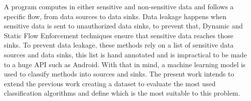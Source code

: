 A program computes in either sensitive and non-sensitive data and follows a specific flow, from data sources to data sinks.
Data leakage happens when sensitive data is sent to unauthorized data sinks, to prevent that, Dynamic and Static Flow Enforcement 
techniques ensure that sensitive data reaches those sinks. To prevent data leakage, 
these methods rely on a list of sensitive data sources and data sinks, this list is hand annotated and is impractical to be made to a huge API such as Android. 
With that in mind, a machine learning model is used to classify methods into sources and sinks. 
The present work intends to extend the previous work creating a dataset to evaluate the most used classification algorithms and define which is the most suitable to this problem.